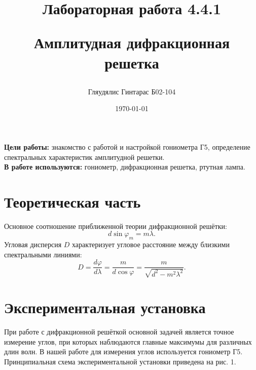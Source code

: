 \documentclass[a4paper,12pt]{article}
\author{Гляудялис Гинтарас Б02-104}
\title{Лабораторная работа 4.4.1

Амплитудная дифракционная решетка}
\date{\today}
\begin{document}
\maketitle

\begin{flushleft}
    \hspace*{2.5 mm}
    \textbf{Цели работы:}
    знакомство с работой и настройкой гониометра Г5, 
    определение спектральных характеристик амплитудной 
    решетки. \\
    \hspace*{2.5 mm}
    \textbf{В работе используются:}
    гониометр, дифракционная решетка, ртутная лампа.
\end{flushleft}

\section{Теоретическая часть}
\begin{flushleft}
    \hspace*{2.5 mm}
    Основное соотношение приближенной теории дифракционной решётки:
    \begin{equation}
        d \sin \varphi_m = m \lambda.
    \end{equation}
    \hspace*{2.5 mm}
    Угловая дисперсия $D$ характеризует угловое расстояние между близкими спектральными линиями:
    \begin{equation}
        D = \dfrac{d \varphi}{d \lambda} = \dfrac{m}{d \cos \varphi} = \dfrac{m}{\sqrt{d^2 - m^2 \lambda^2}}.
    \end{equation}
\end{flushleft}

\section{Экспериментальная установка}
\begin{flushleft}
    \hspace*{2.5 mm}
    При работе с дифракционной решёткой основной задачей 
    является точное измерение углов, при которых наблюдаются 
    главные максимумы для различных длин волн. 
    В нашей работе для измерения углов используется 
    гониометр Г5. Принципиальная схема экспериментальной 
    установки приведена на рис. 1. \\
\end{flushleft}
\end{document}
